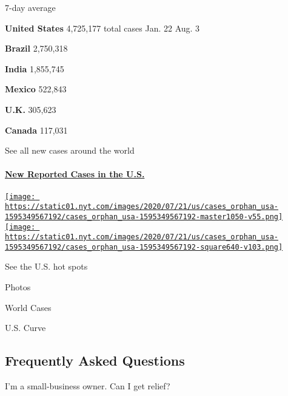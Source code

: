 7-day average

\textbf{United States} 4,725,177 total cases Jan. 22 Aug.
3\href{https://www.nytimes.com/interactive/2020/world/americas/brazil-coronavirus-cases.html}{}

\textbf{Brazil} 2,750,318
\href{https://www.nytimes.com/interactive/2020/world/asia/india-coronavirus-cases.html}{}

\textbf{India} 1,855,745
\href{https://www.nytimes.com/interactive/2020/world/americas/mexico-coronavirus-cases.html}{}

\textbf{Mexico} 522,843
\href{https://www.nytimes.com/interactive/2020/world/europe/united-kingdom-coronavirus-cases.html}{}

\textbf{U.K.} 305,623
\href{https://www.nytimes.com/interactive/2020/world/canada/canada-coronavirus-cases.html}{}

\textbf{Canada} 117,031

\href{https://www.nytimes.com/interactive/2020/world/coronavirus-maps.html}{}

See all new cases around the world

\hypertarget{new-reported-cases-in-the-us}{%
\paragraph{\texorpdfstring{\href{https://www.nytimes.com/interactive/2020/us/coronavirus-us-cases.html}{New
Reported Cases in the
U.S.}}{New Reported Cases in the U.S.}}\label{new-reported-cases-in-the-us}}

\href{https://www.nytimes.com/interactive/2020/us/coronavirus-us-cases.html}{\texttt{[image: https://static01.nyt.com/images/2020/07/21/us/cases\_orphan\_usa-1595349567192/cases\_orphan\_usa-1595349567192-master1050-v55.png]}
\texttt{[image: https://static01.nyt.com/images/2020/07/21/us/cases\_orphan\_usa-1595349567192/cases\_orphan\_usa-1595349567192-square640-v103.png]}}

See the U.S. hot spots

Photos

World Cases

U.S. Curve

\hypertarget{frequently-asked-questions}{%
\subsection{Frequently Asked
Questions}\label{frequently-asked-questions}}

 I'm a small-business owner. Can I get relief?

